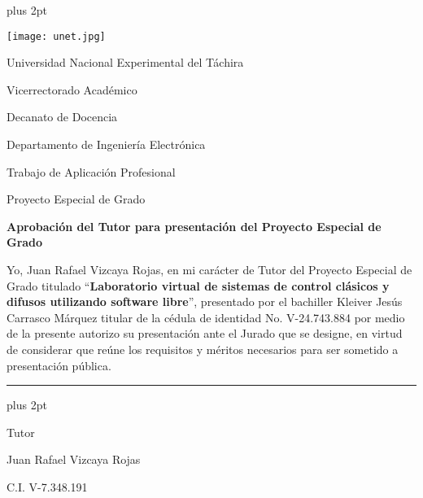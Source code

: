 % 

\begin{titlepage}
\parskip=7.25pt plus 2pt
\setcounter{page}{3}
\begin{center}
    \begin{spacing}{1}
    \texttt{[image: unet.jpg]}
    
    Universidad Nacional Experimental del Táchira 
    
    Vicerrectorado Académico
    
    Decanato de Docencia
    
    Departamento de Ingeniería Electrónica
    
    Trabajo de Aplicación Profesional
    
    Proyecto Especial de Grado
    \end{spacing}
\end{center}

\vspace{0.5cm}

\begin{center}
        
        \textbf{Aprobación del Tutor para presentación del Proyecto Especial de Grado}
        
\end{center}

\vspace{0.5cm}

\begin{spacing}{1.5}
    Yo, Juan Rafael Vizcaya Rojas, en mi carácter de Tutor del Proyecto Especial de Grado titulado \enquote{\textbf{Laboratorio virtual de sistemas de control clásicos y difusos utilizando software libre}}, presentado por el bachiller Kleiver Jesús Carrasco Márquez titular de la cédula de identidad No. \mbox{V-24.743.884} por medio de la presente autorizo su presentación ante el Jurado que se designe, en virtud de considerar que reúne los requisitos y méritos necesarios para ser sometido a presentación pública.
\end{spacing}

\vfill

\begin{center}
    
    \rule{6cm}{1pt}
    
    \vspace{0.2cm}
    
    \parskip=0pt plus 2pt
    
    \begin{spacing}{1}
        Tutor
    
        Juan Rafael Vizcaya Rojas
    
        C.I. V-7.348.191
    \end{spacing}
    
\end{center}

\vspace{0.5cm}

\end{titlepage}

